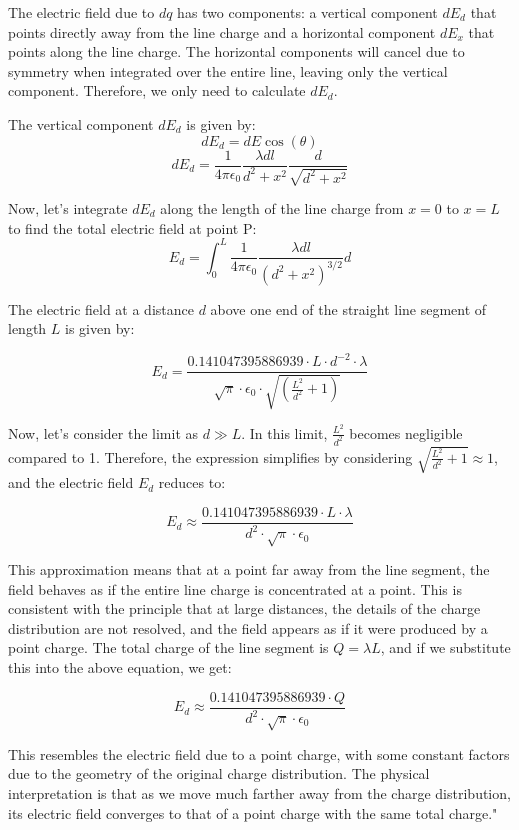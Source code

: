 The electric field due to \( dq \) has two components: a vertical component \( dE_d \) that points directly away from the line charge and a horizontal component \( dE_x \) that points along the line charge. The horizontal components will cancel due to symmetry when integrated over the entire line, leaving only the vertical component. Therefore, we only need to calculate \( dE_d \).

The vertical component \( dE_d \) is given by:
\[ dE_d = dE \cos(\theta) \]
\[ dE_d = \frac{1}{4\pi\epsilon_0} \frac{\lambda dl}{d^2 + x^2} \frac{d}{\sqrt{d^2 + x^2}} \]

Now, let's integrate \( dE_d \) along the length of the line charge from \( x = 0 \) to \( x = L \) to find the total electric field at point P:
\[ E_d = \int_{0}^{L} \frac{1}{4\pi\epsilon_0} \frac{\lambda dl}{(d^2 + x^2)^{3/2}} d \]

The electric field at a distance \( d \) above one end of the straight line segment of length \( L \) is given by:

\[ E_d = \frac{0.141047395886939 \cdot L \cdot d^{-2} \cdot \lambda}{\sqrt{\pi} \cdot \epsilon_0 \cdot \sqrt{\left(\frac{L^2}{d^2} + 1\right)}} \]

Now, let's consider the limit as \( d \gg L \). In this limit, \( \frac{L^2}{d^2} \) becomes negligible compared to 1. Therefore, the expression simplifies by considering \( \sqrt{\frac{L^2}{d^2} + 1} \approx 1 \), and the electric field \( E_d \) reduces to:

\[ E_d \approx \frac{0.141047395886939 \cdot L \cdot \lambda}{d^2 \cdot \sqrt{\pi} \cdot \epsilon_0} \]

This approximation means that at a point far away from the line segment, the field behaves as if the entire line charge is concentrated at a point. This is consistent with the principle that at large distances, the details of the charge distribution are not resolved, and the field appears as if it were produced by a point charge. The total charge of the line segment is \( Q = \lambda L \), and if we substitute this into the above equation, we get:

\[ E_d \approx \frac{0.141047395886939 \cdot Q}{d^2 \cdot \sqrt{\pi} \cdot \epsilon_0} \]

This resembles the electric field due to a point charge, with some constant factors due to the geometry of the original charge distribution. The physical interpretation is that as we move much farther away from the charge distribution, its electric field converges to that of a point charge with the same total charge."

